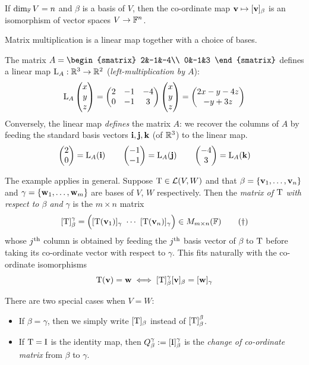 \begin{thm*}{}
	If $\dim_{\mathbb{F}} V=n$ and $\beta$ is a basis of $V$, then the co-ordinate map ${\mathbf{v}}\mapsto[{\mathbf{v}}]_\beta$ is an isomorphism of vector spaces $V\to\mathbb{F}^n$.
\end{thm*}



Matrix multiplication is a linear map together with a choice of bases.

\begin{example*}{}
	The matrix $A=\begin{smatrix}
	2&-1&-4\\
	0&-1&3
	\end{smatrix}$ defines a linear map $\mathrm{L}_A:\mathbb{R}^3\to\mathbb{R}^2$ (\emph{left-multiplication by $A$}):
	\[
		\mathrm{L}_A\begin{pmatrix}x\\y\\z\end{pmatrix} =
		\begin{pmatrix}
			2&-1&-4\\
			0&-1&3
		\end{pmatrix}
		\begin{pmatrix}x\\y\\z\end{pmatrix} =\begin{pmatrix}2x-y-4z\\-y+3z\end{pmatrix}
	\]
	Conversely, the linear map \emph{defines} the matrix $A$: we recover the columns of $A$ by feeding the standard basis vectors ${\mathbf{i}},{\mathbf{j}},{\mathbf{k}}$ (of $\mathbb{R}^3$) to the linear map.
	\[
		\begin{pmatrix}2\\0\end{pmatrix}=\mathrm{L}_A({\mathbf{i}})\qquad
		\begin{pmatrix}-1\\-1\end{pmatrix}=\mathrm{L}_A({\mathbf{j}})\qquad
		\begin{pmatrix}-4\\3\end{pmatrix}=\mathrm{L}_A({\mathbf{k}})
	\]
\end{example*}

The example applies in general. Suppose $\mathrm{T}\in\mathcal{L}(V,W)$ and that $\beta=\{{\mathbf{v}}_1,\ldots,{\mathbf{v}}_n\}$ and $\gamma=\{{\mathbf{w}}_1,\ldots,{\mathbf{w}}_m\}$ are bases of $V$, $W$ respectively. Then the \emph{matrix of $\mathrm{T}$ with respect to $\beta$ and $\gamma$} is the $m\times n$ matrix
\[
	[\mathrm{T}]_\beta^\gamma
	=\Big([\mathrm{T}({\mathbf{v}}_1)]_\gamma\ \cdots\ [\mathrm{T}({\mathbf{v}}_n)]_\gamma\Big)\in M_{m\times n}(\mathbb{F})
	\tag{$\dag$}
\]
whose $j\textsuperscript{th}$ column is obtained by feeding the $j\textsuperscript{th}$ basis vector of $\beta$ to $\mathrm{T}$ before taking its co-ordinate vector with respect to $\gamma$. This fits naturally with the co-ordinate isomorphisms
\[
	\mathrm{T}({\mathbf{v}})={\mathbf{w}}\iff [\mathrm{T}]_\beta^\gamma[{\mathbf{v}}]_\beta=[{\mathbf{w}}]_\gamma
\]

\label{pg:changeofcoords}
There are two special cases when $V=W$:
\begin{itemize}
  \item If $\beta=\gamma$, then we simply write $[\mathrm{T}]_\beta$ instead of $[\mathrm{T}]_\beta^\beta$.
  \item If $\mathrm{T}=\mathrm{I}$ is the identity map, then $Q_\beta^\gamma:=[\mathrm{I}]_\beta^\gamma$ is the \emph{change of co-ordinate matrix} from $\beta$ to $\gamma$.
\end{itemize}



